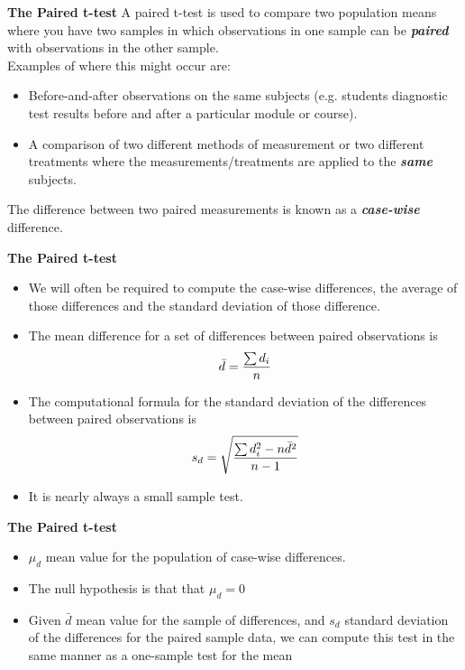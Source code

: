 \documentclass[a4]{beamer}
\begin{document}
{
\noindent \textbf{The Paired t-test}
A paired t-test is used to compare two population means where you have two samples in
which observations in one sample can be \textbf{\emph{paired}} with observations in the other sample.\\
\bigskip
Examples of where this might occur are:
\begin{itemize}
\item Before-and-after observations on the same subjects (e.g. students diagnostic test
results before and after a particular module or course).
\item A comparison of two different methods of measurement or two different treatments
where the measurements/treatments are applied to the \textbf{\emph{same}} subjects.
\end{itemize}
The difference between two paired measurements is known as a \textbf{\emph{case-wise}} difference.
}




\noindent \textbf{The Paired t-test}
\begin{itemize}
\item We will often be required to compute the case-wise differences, the average of those differences and the standard deviation of those difference.

\item The mean difference for a set of differences between paired observations is
\[ \bar{d} = {\sum d_i \over n }\]

\item The computational formula for the standard deviation of the differences
between paired observations is
\[s_d = \sqrt{ {\sum d_i^2 - n\bar{d}^2 \over n-1}}\]
\item It is nearly always a small sample test.
\end{itemize}



{
\noindent \textbf{The Paired t-test}
\begin{itemize}
\item $\mu_d$ mean value for the population of case-wise differences.
\item The null hypothesis is that that $\mu_d = 0$
\item Given $\bar{d}$ mean value for the sample of differences, and $s_d$ standard deviation of the differences for the paired sample data, we can compute this test in the same manner as a one-sample test for the mean
\end{itemize}
}
\end{document}
